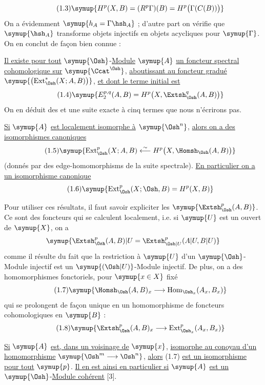 \begin{equation}\tag{1.3}
  \symup{H^{p}(X,B)=(R^{p}\Gamma)(B)=H^{p}\bigl(\Gamma(C(B))\bigr)}
\end{equation}
On a évidemment $\symup{h_A=\Gamma\hsh_A}$ ; d'autre part on vérifie que $\symup{\hsh_A}$
transforme objets injectifs en objets acycliques pour $\symup{\Gamma}$. On en conclut de
façon bien connue :

 \uline{Il existe pour tout} $\symup{\Osh}$-\uline{Module} $\symup{A}$ \uline{un foncteur
spectral cohomologique sur} $\symup{\Ccat^{\Osh}}$, \uline{aboutissant au foncteur gradué}
$\symup{\bigl(\operatorname{Ext}_{\Osh}^{*}(X;A,B)\bigr)}$, \uline{et dont le terme initial est}
\begin{equation}\tag{1.4}
  \symup{E_{2}^{p,q}(A,B)=H^{p}\bigl(X,\Extsh_{\Osh}^{q}(A,B)\bigr)}
\end{equation}
On en déduit des  et une suite exacte à cinq termes
que nous n'écrirons pas.

 \uline{Si} $\symup{A}$ \uline{est localement isomorphe à} $\symup{\Osh^{n}}$, \uline{alors on a
des isomorphismes canoniques}
\begin{equation}\tag{1.5}
  \symup{\operatorname{Ext}_{\Osh}^{p}(X;A,B)
  \overset{\sim}{\longleftarrow}
  H^{p}\bigl(X,\Homsh_{\Osh}(A,B)\bigr)}
\end{equation}
(donnés par des edge-homomorphisms de la suite spectrale). \uline{En particulier on a
un isomorphisme canonique}
\begin{equation}\tag{1.6}
  \symup{\operatorname{Ext}_{\Osh}^{p}(X;\Osh,B)=H^{p}(X,B)}
\end{equation}

Pour utiliser ces résultats, il faut savoir expliciter les
$\symup{\Extsh_{\Osh}^{p}(A,B)}$. Ce sont des foncteurs qui se calculent localement,
i.e. si $\symup{U}$ est un ouvert de $\symup{X}$, on a
\[
  \symup{\Extsh_{\Osh}^{p}(A,B)|U
  =\Extsh_{\Osh|U}^{p}(A|U,B|U)}
\]
comme il résulte du fait que la restriction à $\symup{U}$ d'un $\symup{\Osh}$-Module injectif
est un $\symup{(\Osh|U)}$-Module injectif. De plus, on a des homomorphismes fonctoriels,
pour $\symup{x\in X}$ fixé
\begin{equation}\tag{1.7}
  \symup{\Homsh_{\Osh}(A,B)_x
  \longrightarrow
  \operatorname{Hom}_{\Osh_x}(A_x,B_x)}
\end{equation}
qui se prolongent de façon unique en un homomorphisme de foncteurs cohomologiques
en $\symup{B}$ :
\begin{equation}\tag{1.8}
  \symup{\Extsh_{\Osh}^{p}(A,B)_x
  \longrightarrow
  \operatorname{Ext}_{\Osh_x}^{p}(A_x,B_x)}
\end{equation}

 \uline{Si} $\symup{A}$ \uline{est, dans un voisinage de} $\symup{x}$, \uline{isomorphe au
conoyau d'un homomorphisme} $\symup{\Osh^{m}\longrightarrow\Osh^{n}}$, \uline{alors} (1.7) \uline{est un isomorphisme pour tout} $\symup{p}$. \uline{Il en est ainsi en
particulier si} $\symup{A}$ \uline{est un} $\symup{\Osh}$-\uline{Module cohérent} [3].

